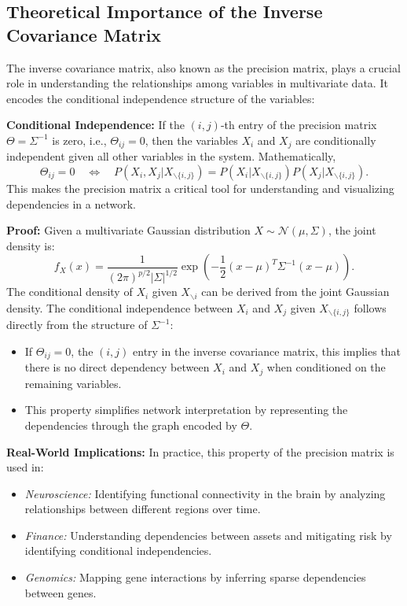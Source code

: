 \documentclass{article}
\begin{document}
\subsection{Theoretical Importance of the Inverse Covariance Matrix}
\label{subsec:importance_inverse_cov}

The inverse covariance matrix, also known as the precision matrix, plays a crucial role in understanding the relationships among variables in multivariate data. It encodes the conditional independence structure of the variables:

\vspace{0.5em}
\noindent\textbf{Conditional Independence:}
If the $(i,j)$-th entry of the precision matrix $\Theta = \Sigma^{-1}$ is zero, i.e., $\Theta_{ij} = 0$, then the variables $X_i$ and $X_j$ are conditionally independent given all other variables in the system. Mathematically,
\begin{equation}
    \Theta_{ij} = 0 \quad \iff \quad P(X_i, X_j | X_{\backslash \{i,j\}}) = P(X_i | X_{\backslash \{i,j\}}) P(X_j | X_{\backslash \{i,j\}}).
\end{equation}
This makes the precision matrix a critical tool for understanding and visualizing dependencies in a network.

\vspace{0.5em}
\noindent\textbf{Proof:}
Given a multivariate Gaussian distribution $X \sim \mathcal{N}(\mu, \Sigma)$, the joint density is:
\begin{equation}
    f_X(x) = \frac{1}{(2\pi)^{p/2} |\Sigma|^{1/2}} \exp\left(-\frac{1}{2}(x - \mu)^T \Sigma^{-1} (x - \mu)\right).
\end{equation}
The conditional density of $X_i$ given $X_{\backslash i}$ can be derived from the joint Gaussian density. The conditional independence between $X_i$ and $X_j$ given $X_{\backslash \{i,j\}}$ follows directly from the structure of $\Sigma^{-1}$:
\begin{itemize}
    \item If $\Theta_{ij} = 0$, the $(i,j)$ entry in the inverse covariance matrix, this implies that there is no direct dependency between $X_i$ and $X_j$ when conditioned on the remaining variables.
    \item This property simplifies network interpretation by representing the dependencies through the graph encoded by $\Theta$.
\end{itemize}

\vspace{0.5em}
\noindent\textbf{Real-World Implications:}
In practice, this property of the precision matrix is used in:
\begin{itemize}
    \item \textit{Neuroscience:} Identifying functional connectivity in the brain by analyzing relationships between different regions over time.
    \item \textit{Finance:} Understanding dependencies between assets and mitigating risk by identifying conditional independencies.
    \item \textit{Genomics:} Mapping gene interactions by inferring sparse dependencies between genes.
\end{itemize}
\end{document}
